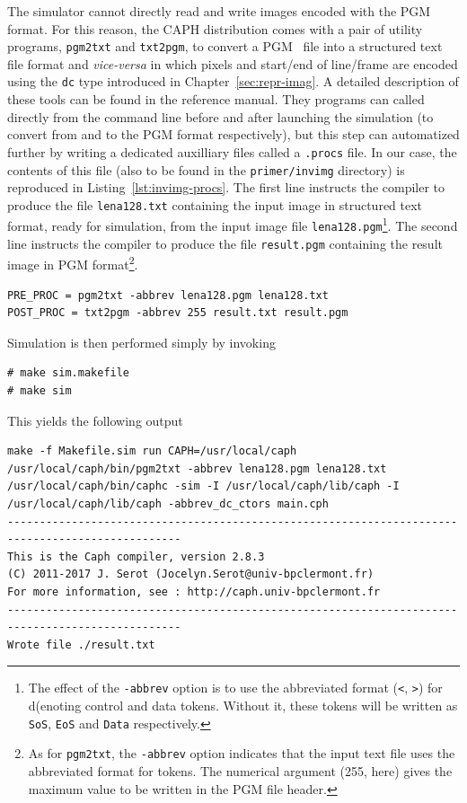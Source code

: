 The simulator cannot directly read and write images encoded with the PGM format. For this reason,
the CAPH distribution comes with a pair of utility programs, \verb|pgm2txt| and \verb|txt2pgm|, to
convert a PGM~\cite{PGM} file into a structured text file format and \emph{vice-versa} in which
pixels and start/end of line/frame are encoded using the \verb|dc| type introduced in
Chapter~\ref{sec:repr-imag}. A detailed description of these tools can be found in the reference
manual. They programs can called directly from the command line before and after launching the
simulation (to convert from and to the PGM format respectively), but this step can automatized
further by writing a dedicated auxilliary files called a \verb|.procs| file.  In our case, the
contents of this file (also to be found in the \verb|primer/invimg| directory) is reproduced in
Listing~\ref{lst:invimg-procs}.  The first line instructs the compiler to produce the file
\verb|lena128.txt| containing the input image in structured text format, ready for simulation, from
the input image file \verb|lena128.pgm|\footnote{The effect of the \texttt{-abbrev} option is to use
  the abbreviated format (\texttt{<}, \texttt{>}) for d(enoting control and data tokens. Without it,
  these tokens will be written as \texttt{SoS}, \texttt{EoS} and \texttt{Data} respectively.}.  The
second line instructs the compiler to produce the file \verb|result.pgm| containing the result image
in PGM format\footnote{As for \texttt{pgm2txt}, the \texttt{-abbrev} option indicates that the input
  text file uses the abbreviated format for tokens. The numerical argument (255, here) gives the
  maximum value to be written in the PGM file header.}.

\begin{lstlisting}[style=MakeStyle,caption={File
    \texttt{invimg.procs} for the \texttt{invimg} program of
    Listing~\ref{lst:invimg-full}},label={lst:invimg-procs}]
PRE_PROC = pgm2txt -abbrev lena128.pgm lena128.txt
POST_PROC = txt2pgm -abbrev 255 result.txt result.pgm
\end{lstlisting}

\medskip
Simulation is then performed simply by invoking

\begin{lstlisting}[style=BashInputStyle]
# make sim.makefile
# make sim
\end{lstlisting}

This yields the following output 

\begin{lstlisting}[style=BashOutputStyle]
make -f Makefile.sim run CAPH=/usr/local/caph
/usr/local/caph/bin/pgm2txt -abbrev lena128.pgm lena128.txt
/usr/local/caph/bin/caphc -sim -I /usr/local/caph/lib/caph -I /usr/local/caph/lib/caph -abbrev_dc_ctors main.cph
-------------------------------------------------------------------------------------------------
This is the Caph compiler, version 2.8.3
(C) 2011-2017 J. Serot (Jocelyn.Serot@univ-bpclermont.fr)
For more information, see : http://caph.univ-bpclermont.fr
-------------------------------------------------------------------------------------------------
Wrote file ./result.txt
\end{lstlisting}


